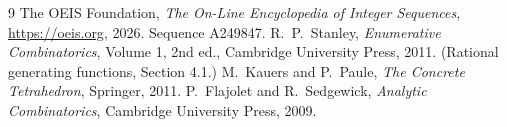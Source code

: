 \documentclass[11pt,a4paper]{article}
\theoremstyle{plain}
\theoremstyle{definition}
\begin{document}
\begin{thebibliography}{9}
 The OEIS Foundation, \emph{The On-Line Encyclopedia of Integer
Sequences}, \url{https://oeis.org}, 2026. Sequence A249847.
 R.~P.~Stanley, \emph{Enumerative Combinatorics}, Volume 1, 2nd ed.,
Cambridge University Press, 2011. (Rational generating functions, Section 4.1.)
 M.~Kauers and P.~Paule, \emph{The Concrete Tetrahedron}, Springer, 2011.
 P.~Flajolet and R.~Sedgewick, \emph{Analytic Combinatorics}, Cambridge
University Press, 2009.
\end{thebibliography}
\end{document}
